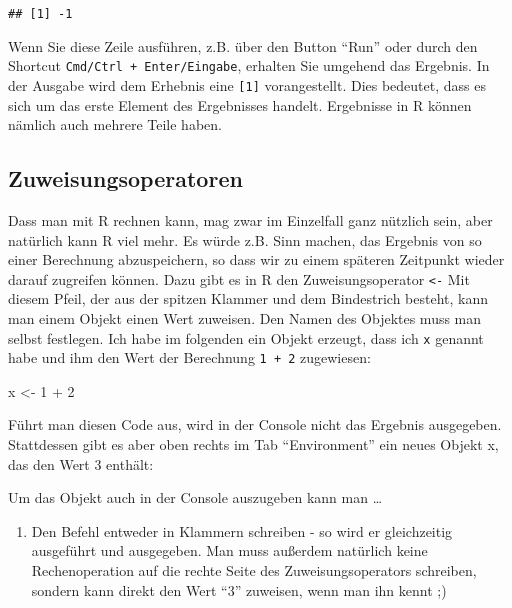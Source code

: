\documentclass[
]{book}
\newenvironment{Shaded}{\begin{snugshade}}{\end{snugshade}}
\newcommand{\DecValTok}[1]{\textcolor[rgb]{0.00,0.00,0.81}{#1}}
\newcommand{\NormalTok}[1]{#1}
\newcommand{\OtherTok}[1]{\textcolor[rgb]{0.56,0.35,0.01}{#1}}
\newcommand{\SpecialCharTok}[1]{\textcolor[rgb]{0.00,0.00,0.00}{#1}}
\providecommand{\tightlist}{%
  \setlength{\itemsep}{0pt}\setlength{\parskip}{0pt}}
\begin{document}
\begin{verbatim}
## [1] -1
\end{verbatim}

Wenn Sie diese Zeile ausführen, z.B. über den Button ``Run'' oder durch den Shortcut \texttt{Cmd/Ctrl\ +\ Enter/Eingabe}, erhalten Sie umgehend das Ergebnis. In der Ausgabe wird dem Erhebnis eine \texttt{{[}1{]}} vorangestellt. Dies bedeutet, dass es sich um das erste Element des Ergebnisses handelt. Ergebnisse in R können nämlich auch mehrere Teile haben.

\hypertarget{zuweisungsoperatoren}{%
\subsection{Zuweisungsoperatoren}\label{zuweisungsoperatoren}}

Dass man mit R rechnen kann, mag zwar im Einzelfall ganz nützlich sein, aber natürlich kann R viel mehr. Es würde z.B. Sinn machen, das Ergebnis von so einer Berechnung abzuspeichern, so dass wir zu einem späteren Zeitpunkt wieder darauf zugreifen können. Dazu gibt es in R den Zuweisungsoperator \texttt{\textless{}-} Mit diesem Pfeil, der aus der spitzen Klammer und dem Bindestrich besteht, kann man einem Objekt einen Wert zuweisen. Den Namen des Objektes muss man selbst festlegen. Ich habe im folgenden ein Objekt erzeugt, dass ich \texttt{x} genannt habe und ihm den Wert der Berechnung \texttt{1\ +\ 2} zugewiesen:

\begin{Shaded}
\begin{Highlighting}[]
\NormalTok{x }\OtherTok{\textless{}{-}} \DecValTok{1} \SpecialCharTok{+} \DecValTok{2}
\end{Highlighting}
\end{Shaded}

Führt man diesen Code aus, wird in der Console nicht das Ergebnis ausgegeben. Stattdessen gibt es aber oben rechts im Tab ``Environment'' ein neues Objekt x, das den Wert 3 enthält:

Um das Objekt auch in der Console auszugeben kann man \ldots{}

\begin{enumerate}
\def\labelenumi{\arabic{enumi}.}
\tightlist
\item
  Den Befehl entweder in Klammern schreiben - so wird er gleichzeitig ausgeführt und ausgegeben. Man muss außerdem natürlich keine Rechenoperation auf die rechte Seite des Zuweisungsoperators schreiben, sondern kann direkt den Wert ``3'' zuweisen, wenn man ihn kennt ;)
\end{enumerate}
\end{document}
